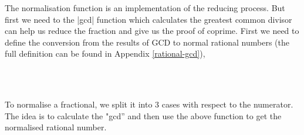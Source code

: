 The normalisation function is an implementation of the reducing
process. But first we need to  the |gcd| function which calculates the greatest common
divisor can help us reduce the fraction and give us the proof of
coprime. First we need to define the conversion from the results of GCD
to normal rational numbers (the full definition can be found in
Appendix \autoref{rational-gcd}),

\begin{code}
\\
\> \AgdaSymbol{:}               \<%
\\
\end{code}

To normalise a fractional, we split it into 3 cases with respect to
the numerator. The idea is to calculate the "gcd'' and then use the
above function to get the normalised rational number.

\begin{code}
\\
\>\AgdaFunction{[\_]} \AgdaSymbol{:}   \<%
\\
\>\AgdaFunction{[} \AgdaSymbol{(}\AgdaInductiveConstructor{+} \AgdaSymbol{)}   \AgdaFunction{]} \AgdaSymbol{=}    \<%
\\
\>\AgdaFunction{[} \AgdaSymbol{(}\AgdaInductiveConstructor{+} \AgdaSymbol{(} \AgdaSymbol{))}   \AgdaFunction{]}   \AgdaSymbol{(} \AgdaSymbol{)} \AgdaSymbol{(} \AgdaSymbol{)}\<%
\\
\>\AgdaFunction{[} \AgdaSymbol{(}\AgdaInductiveConstructor{+}  \AgdaSymbol{)}   \AgdaFunction{]} \AgdaSymbol{|}  \AgdaInductiveConstructor{,}  \AgdaSymbol{=}  \AgdaSymbol{(} \AgdaSymbol{)} \AgdaSymbol{(} \AgdaSymbol{)}   \AgdaSymbol{())} \AgdaSymbol{(} \AgdaSymbol{)}\<%
\\
\end{code}


